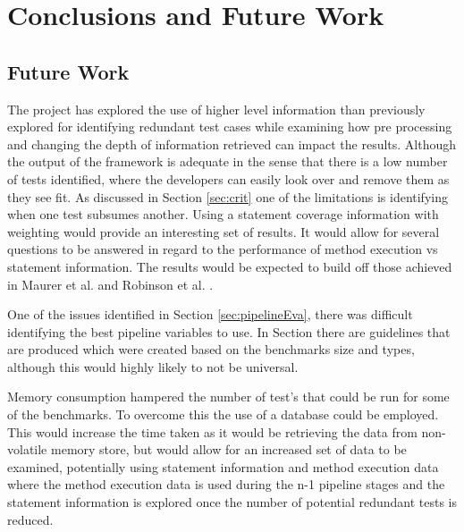 \chapter{Conclusions and Future Work}\label{C:future}

\section{Future Work}
The project has explored the use of higher level information than previously explored for identifying redundant test cases while examining how pre processing and changing the depth of information retrieved can impact the results. Although the output of the framework is adequate in the sense that there is a low number of tests identified, where the developers can easily look over and remove them as they see fit. As discussed in Section \ref{sec:crit} one of the limitations is identifying when one test subsumes another. Using a statement coverage information with weighting would provide an interesting set of results. It would allow for several questions to be answered in regard to the performance of method execution vs statement information. The results would be expected to build off those achieved in Maurer et al. \cite{li2008static}  and Robinson et al. \cite{koochakzadeh2009test}. 

One of the issues identified in Section \ref{sec:pipelineEva}, there was difficult identifying the best pipeline variables to use. In Section  there are guidelines that are produced which were created based on the benchmarks size and types, although this would highly likely to not be universal. 

Memory consumption hampered the number of test's that could be run for some of the benchmarks. To overcome this the use of a database could be employed. This would increase the time taken as it would be retrieving the data from non-volatile memory store, but would allow for an increased set of data to be examined, potentially using statement information and method execution data where the method execution data is used during the n-1 pipeline stages and the statement information is explored once the number of potential redundant tests is reduced. 
\\
\\


